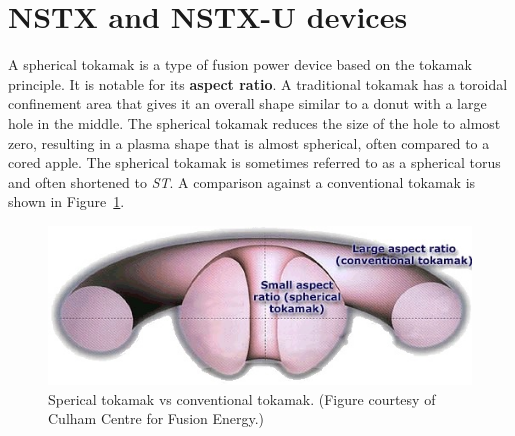 \documentclass[12pt,lot, lof]{puthesis}
\begin{document}

\section{NSTX and NSTX-U devices}

A spherical tokamak is a type of fusion power device based on the tokamak principle. It is notable for its \textbf{aspect ratio}. A traditional tokamak has a toroidal confinement area that gives it an overall shape similar to a donut with a large hole in the middle. The spherical tokamak reduces the size of the hole to almost zero, resulting in a plasma shape that is almost spherical, often compared to a cored apple. The spherical tokamak is sometimes referred to as a spherical torus and often shortened to \emph{ST}. A comparison against a conventional tokamak is shown in Figure~\ref{nstx1}.

\begin{figure}
\centering
\includegraphics[width= 0.7\linewidth]{nstx}
\caption{Sperical tokamak vs conventional tokamak. (Figure courtesy of Culham Centre for Fusion Energy.)}
\label{nstx1}
\end{figure}
\end{document}

